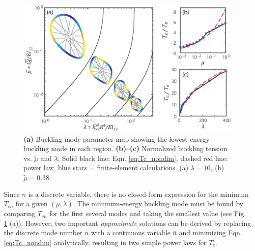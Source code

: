 \documentclass{bmd2016p}
\begin{document}
\begin{figure}[!ht]
\centering
\includegraphics[scale=1.0]{figures/bmd_figures-04.eps}
\caption{\textbf{(a)} Buckling mode parameter map showing the lowest-energy buckling mode in each region. \textbf{(b)}--\textbf{(c)} Normalized buckling tension vs. $\tilde{\mu}$ and $\lambda$. Solid black line: Eqn. \ref{eq:Tc_nondim}, dashed red line: power law, blue stars = finite-element calculations. (a) $\lambda=10$, (b) $\tilde{\mu} = 0.38$.}
\label{fig:Tc_nondim}
\end{figure}

Since $n$ is a discrete variable, there is no closed-form expression for the minimum $T_{cn}$ for a given $(\tilde{\mu},\lambda)$. The minimum-energy buckling mode must be found by comparing $T_{cn}$ for the first several modes and taking the smallest value (see Fig. \ref{fig:Tc_nondim} (a)). However, two important \textit{approximate} solutions can be derived by replacing the discrete mode number $n$ with a continuous variable $\bar{n}$ and minimizing Eqn. \ref{eq:Tc_nondim} analytically, resulting in two simple power laws for $T_c$.
\end{document}
